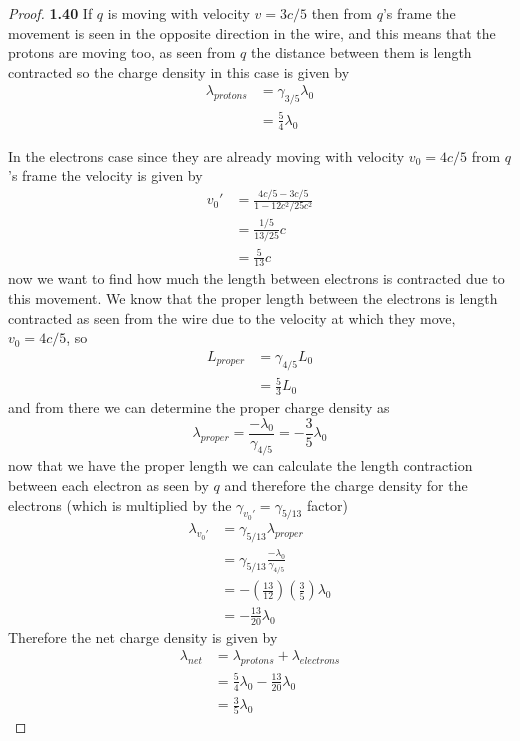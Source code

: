 \documentclass[11pt]{article}
\theoremstyle{definition}
\begin{document}
    \begin{proof}{\textbf{1.40}}
        If $q$ is moving with velocity $v = 3c/5$ then from $q$'s frame the movement
        is seen in the opposite direction in the wire, and this means that the
        protons are moving too, as seen from $q$ the distance between them is
        length contracted so the charge density in this case is given by
        \begin{align*}
            \lambda_{protons} &= \gamma_{3/5} \lambda_0 \\
                &= \frac{5}{4} \lambda_0
        \end{align*}

        In the electrons case since they are already moving with velocity
        $v_0 = 4c/5$ from $q$'s frame the velocity is given by
        \begin{align*}
            v_0'&= \frac{4c/5 - 3c/5}{1 - 12c^2/25c^2}\\
                &= \frac{1/5}{13/25}c \\
                &= \frac{5}{13}c            
        \end{align*}
        now we want to find how much the length between electrons is
        contracted due to this movement. We know that the proper length between
        the electrons is length contracted as seen from the wire due to the
        velocity at which they move, $v_0 = 4c/5$, so
        \begin{align*}
            L_{proper} &= \gamma_{4/5} L_{0} \\
                &= \frac{5}{3} L_{0}
        \end{align*}
        and from there we can determine the proper charge density as
        $$\lambda_{proper}
            = \frac{-\lambda_0}{\gamma_{4/5}} 
            = -\frac{3}{5}\lambda_0$$
        now that we have the proper length we can calculate the length
        contraction between each electron as seen by $q$ and therefore the
        charge density for the electrons (which is multiplied by the
        $\gamma_{v_0'} = \gamma_{5/13}$ factor) 
        \begin{align*}
            \lambda_{v_0'}
                &= \gamma_{5/13}\lambda_{proper} \\
                &= \gamma_{5/13}\frac{-\lambda_0}{\gamma_{4/5}} \\
                &= -\left(\frac{13}{12}\right)\left(\frac{3}{5}\right)\lambda_0 \\
                &= -\frac{13}{20} \lambda_0
        \end{align*}
        Therefore the net charge density is given by
        \begin{align*}
            \lambda_{net} &= \lambda_{protons} + \lambda_{electrons}\\
                &= \frac{5}{4}\lambda_0 - \frac{13}{20}\lambda_0\\
                &= \frac{3}{5}\lambda_0
        \end{align*}
    \end{proof}
\end{document}
